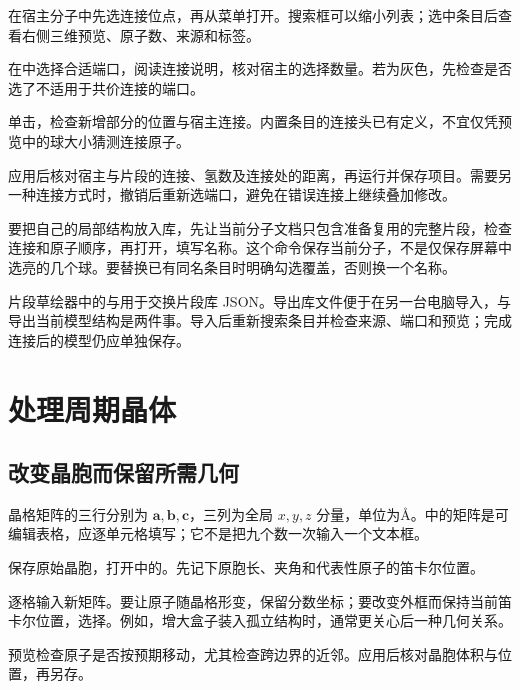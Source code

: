 \begin{steps}
  \item 在宿主分子中先选连接位点，再从菜单打开。搜索框可以缩小列表；选中条目后查看右侧三维预览、原子数、来源和标签。
  \item 在中选择合适端口，阅读连接说明，核对宿主的选择数量。若为灰色，先检查是否选了不适用于共价连接的端口。
  \item 单击，检查新增部分的位置与宿主连接。内置条目的连接头已有定义，不宜仅凭预览中的球大小猜测连接原子。
  \item 应用后核对宿主与片段的连接、氢数及连接处的距离，再运行并保存项目。需要另一种连接方式时，撤销后重新选端口，避免在错误连接上继续叠加修改。
\end{steps}

要把自己的局部结构放入库，先让当前分子文档只包含准备复用的完整片段，检查连接和原子顺序，再打开，填写名称。这个命令保存当前分子，不是仅保存屏幕中选亮的几个球。要替换已有同名条目时明确勾选覆盖，否则换一个名称。

片段草绘器中的与用于交换片段库 JSON。导出库文件便于在另一台电脑导入，与导出当前模型结构是两件事。导入后重新搜索条目并检查来源、端口和预览；完成连接后的模型仍应单独保存。

\section{处理周期晶体}

\subsection{改变晶胞而保留所需几何}\label{sec:lattice-transform-reference}

晶格矩阵的三行分别为 $\mathbf a,\mathbf b,\mathbf c$，三列为全局 $x,y,z$ 分量，单位为\AA。中的矩阵是可编辑表格，应逐单元格填写；它不是把九个数一次输入一个文本框。



\begin{steps}
  \item 保存原始晶胞，打开中的。先记下原胞长、夹角和代表性原子的笛卡尔位置。
  \item 逐格输入新矩阵。要让原子随晶格形变，保留分数坐标；要改变外框而保持当前笛卡尔位置，选择。例如，增大盒子装入孤立结构时，通常更关心后一种几何关系。
  \item 预览检查原子是否按预期移动，尤其检查跨边界的近邻。应用后核对晶胞体积与位置，再另存。
\end{steps}

